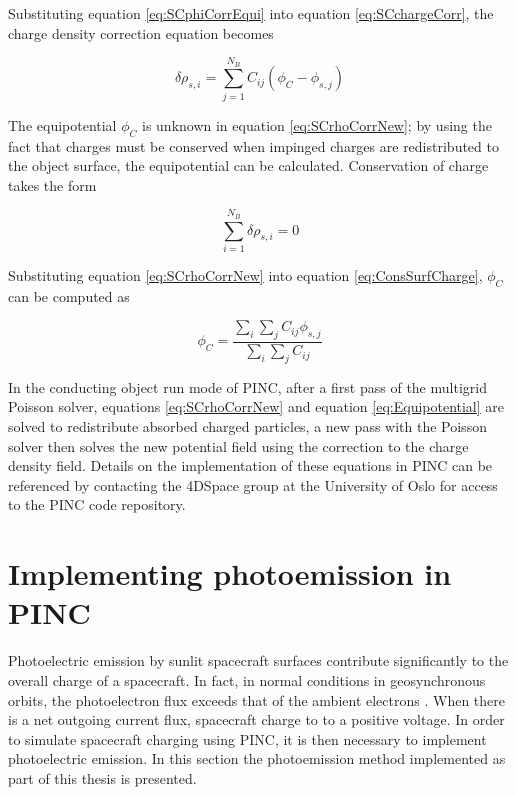 Substituting equation \eqref{eq:SCphiCorrEqui} into equation \eqref{eq:SCchargeCorr}, the charge density correction equation becomes

\begin{equation}\label{eq:SCrhoCorrNew}
    \delta \rho_{s,i} = \sum^{N_B}_{j=1} C_{ij} (\phi_C - \phi_{s,j})
\end{equation}

The equipotential $\phi_C$ is unknown in equation \eqref{eq:SCrhoCorrNew}; by using the fact that charges must be conserved when impinged charges are redistributed to the object surface, the equipotential can be calculated. Conservation of charge takes the form

\begin{equation}\label{eq:ConsSurfCharge}
    \sum^{N_B}_{i=1} \delta \rho_{s,i} = 0
\end{equation}

Substituting equation \eqref{eq:SCrhoCorrNew} into equation \eqref{eq:ConsSurfCharge}, $\phi_C$ can be computed as

\begin{equation}\label{eq:Equipotential}
    \phi_C = \frac{\sum_i \sum_j C_{ij} \phi_{s,j}}{\sum_i \sum_j C_{ij}}
\end{equation}

In the conducting object run mode of PINC, after a first pass of the multigrid Poisson solver, equations \eqref{eq:SCrhoCorrNew} and equation \eqref{eq:Equipotential} are solved to redistribute absorbed charged particles, a new pass with the Poisson solver then solves the new potential field using the correction to the charge density field. Details on the implementation of these equations in PINC can be referenced by contacting the 4DSpace group at the University of Oslo for access to the PINC code repository.

\newpage

\section{Implementing photoemission in PINC}

Photoelectric emission by sunlit spacecraft surfaces contribute significantly to the overall charge of a spacecraft. In fact, in normal conditions in geosynchronous orbits, the photoelectron flux exceeds that of the ambient electrons \parencite{Lai2006}. When there is a net outgoing current flux, spacecraft charge to to a positive voltage. In order to simulate spacecraft charging using PINC, it is then necessary to implement photoelectric emission. In this section the photoemission method implemented as part of this thesis is presented. 


